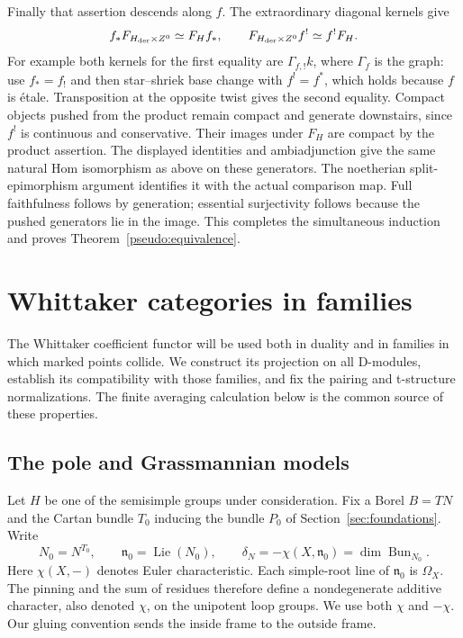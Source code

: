 \documentclass[11pt]{article}
\numberwithin{equation}{section}
\theoremstyle{definition}
\theoremstyle{remark}
\begin{document}
Finally that assertion descends along $f$.  The extraordinary diagonal
kernels give
\[
 f_*F_{H_{\rm der}\times Z^0}\simeq F_Hf_* ,\qquad
 F_{H_{\rm der}\times Z^0}f^!\simeq f^!F_H.
\]
For example both kernels for the first equality are
$\Gamma_{f,!}k$, where $\Gamma_f$ is the graph: use $f_*=f_!$ and then
star--shriek base change with $f^!=f^*$, which holds because $f$ is
\'{e}tale.  Transposition at the opposite twist gives the second equality.
Compact objects pushed from the product remain compact and generate
downstairs, since $f^!$ is continuous and conservative.  Their images
under $F_H$ are compact by the product assertion.  The displayed identities
and ambiadjunction give the same natural Hom isomorphism as above on these
generators.  The noetherian split-epimorphism argument identifies it with
the actual comparison map.  Full faithfulness follows by generation;
essential surjectivity follows because the pushed generators lie in the
image.  This completes the simultaneous induction and proves
Theorem~\ref{pseudo:equivalence}.

\section{Whittaker categories in families}\label{sec:whittaker}

The Whittaker coefficient functor will be used both in duality and in
families in which marked points collide. We construct its projection on
all D-modules, establish its compatibility with those families, and fix the
pairing and t-structure normalizations. The finite averaging calculation
below is the common source of these properties.

\subsection{The pole and Grassmannian models}

Let $H$ be one of the semisimple groups under consideration. Fix a Borel
$B=TN$ and the Cartan bundle $T_0$ inducing the bundle $P_0$ of
Section~\ref{sec:foundations}. Write
\[
 N_0=N^{T_0},\qquad \mathfrak n_0=\operatorname{Lie}(N_0),\qquad
 \delta_N=-\chi(X,\mathfrak n_0)=\dim\operatorname{Bun}_{N_0}.
\]
Here $\chi(X,-)$ denotes Euler characteristic. Each simple-root line of
$\mathfrak n_0$ is $\Omega_X$. The pinning and the sum of residues therefore
define a nondegenerate additive character, also denoted $\chi$, on the
unipotent loop groups. We use both $\chi$ and $-\chi$. Our gluing convention
sends the inside frame to the outside frame.
\end{document}
